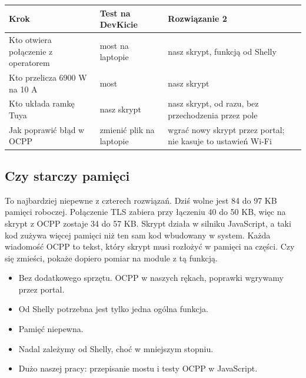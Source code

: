 \documentclass[11pt,a4paper]{article}
\begin{document}
\begin{longtable}{>{\raggedright\arraybackslash}p{4.93cm}>{\raggedright\arraybackslash}p{3.13cm}>{\raggedright\arraybackslash}p{7.22cm}}
\toprule
\rowcolor{apteallight}\textbf{Krok} & \textbf{Test na DevKicie} & \textbf{Rozwiązanie 2} \\
\midrule\endhead
\bottomrule\endfoot
Kto otwiera połączenie z operatorem & most na laptopie & nasz skrypt, funkcją od Shelly \\
Kto przelicza 6900 W na 10 A & most & nasz skrypt \\
Kto układa ramkę Tuya & nasz skrypt & nasz skrypt, od razu, bez przechodzenia przez pole \\
Jak poprawić błąd w OCPP & zmienić plik na laptopie & wgrać nowy skrypt przez portal; nie kasuje to ustawień Wi-Fi \\
\end{longtable}

\subsection{Czy starczy pamięci}

 To najbardziej niepewne z czterech rozwiązań. Dziś wolne jest 84 do 97 KB pamięci roboczej. Połączenie TLS zabiera przy łączeniu 40 do 50 KB, więc na skrypt z OCPP zostaje 34 do 57 KB. Skrypt działa w silniku JavaScript, a taki kod zużywa więcej pamięci niż ten sam kod wbudowany w system. Każda wiadomość OCPP to tekst, który skrypt musi rozłożyć w pamięci na części. Czy się zmieści, pokaże dopiero pomiar na module z tą funkcją.


\begin{itemize}
\item {} Bez dodatkowego sprzętu. OCPP w naszych rękach, poprawki wgrywamy przez portal.
\item {} Od Shelly potrzebna jest tylko jedna ogólna funkcja.
\item {} Pamięć niepewna.
\item {} Nadal zależymy od Shelly, choć w mniejszym stopniu.
\item {} Dużo naszej pracy: przepisanie mostu i testy OCPP w JavaScript.
\end{itemize}
\end{document}
